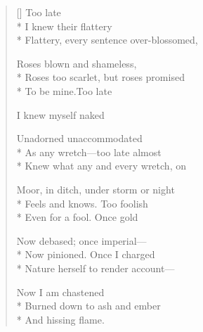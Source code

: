\label{ch:lear_az}
\settowidth{\versewidth}{Flattery, every sentence over-blossomed,}
\begin{verse}[\versewidth]
 \hspace*{3\vgap} Too late\\*
I knew their flattery\\*
Flattery, every sentence over-blossomed,

Roses blown and shameless,\\*
Roses too scarlet, but roses promised\\*
To be mine.\qquad Too late

I knew myself naked

Unadorned    unaccommodated\\*
As any wretch---too late almost\\*
Knew what any and every wretch, on

Moor, in ditch, under storm or night\\*
Feels and knows.   Too foolish\\*
Even for a fool.   Once gold

Now debased; once imperial---\\*
Now pinioned.   Once I charged\\*
Nature herself to render account---

Now I am chastened\\*
Burned down to ash and ember\\*
And hissing flame.
\end{verse}
